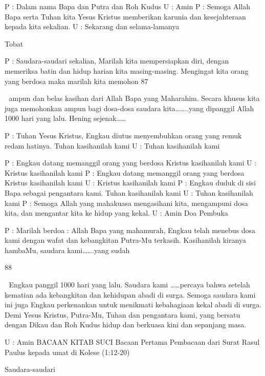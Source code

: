 \documentclass[10pt,a5paper,fancyhdr]{memoir}
\begin{document}
P : Dalam nama Bapa dan Putra dan Roh Kudus 
U : Amin 
P : Semoga Allah Bapa serta Tuhan kita Yesus Kristus 
memberikan karunia dan kesejahteraan kepada kita 
sekalian. 
U : Sekarang dan selama-lamanya 

Tobat 

P 
: Saudara-saudari sekalian, 
Marilah kita mempersiapkan diri, dengan memeriksa 
batin dan hidup harian kita masing-masing. Mengingat 
kita orang yang berdosa maka marilah kita memohon 
87 



ampun dan belas kasihan dari Allah Bapa yang 
Maharahim. Secara khusus kita juga memohonkan ampun 
bagi dosa-dosa saudara kita……..yang dipanggil Allah 
1000 hari yang lalu. 
Hening sejenak…… 

P : Tuhan Yesus Kristus, Engkau diutus menyembuhkan 
orang yang remuk redam hatinya. 
Tuhan kasihanilah kami 
U : Tuhan kasihanilah kami 

P 
: Engkau datang memanggil orang yang berdosa 
Kristus kasihanilah kami 
U : Kristus kasihanilah kami 
P 
: Engkau datang memanggil orang yang berdosa 
Kristus kasihanilah kami 
U : Kristus kasihanilah kami 
P 
: Engkau duduk di sisi Bapa sebagai pengantara kami. 
Tuhan kasihanilah kami 
U : Tuhan kasihanilah kami 
P 
: Semoga Allah yang mahakuasa mengasihani kita, 
mengampuni dosa kita, dan mengantar kita ke hidup yang 
kekal. 
U : Amin 
Doa Pembuka 

P : Marilah berdoa : 
Allah Bapa yang mahamurah, Engkau telah menebus dosa 
kami dengan wafat dan kebangkitan Putra-Mu terkasih. 
Kasihanilah kiranya hambaMu, saudara kami…….yang sudah 

88 



Engkau panggil 1000 hari yang lalu. Saudara kami ……percaya 
bahwa setelah kematian ada kebangkitan dan kehidupan abadi 
di surga. Semoga saudara kami ini juga Engkau perkenankan 
untuk menikmati kebahagiaan kekal abadi di surga. Demi 
Yesus Kristus, Putra-Mu, Tuhan dan pengantara kami, yang 
bersatu dengan Dikau dan Roh Kudus hidup dan berkuasa kini 
dan sepanjang masa. 

U : Amin 
BACAAN KITAB SUCI 
Bacaan Pertama 
Pembacaan dari Surat Rasul Paulus kepada umat di Kolese 
(1:12-20) 

Saudara-saudari 
\end{document}
